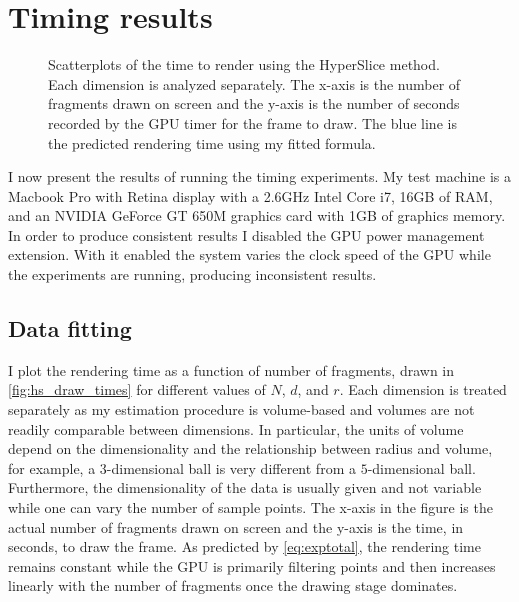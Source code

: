 
\section{Timing results}
\label{sec:timingresults}

\begin{figure}[t]
  \centering
  \resizebox{\linewidth}{!}{%
    {\tiny }}
  \caption[Scatterplots of the time to render using the HyperSlice method.]{%
    Scatterplots of the time to render using the HyperSlice method.
    Each dimension is analyzed separately.  The x-axis is the number of
    fragments drawn on screen and the y-axis is the number of seconds
    recorded by the GPU timer for the frame to draw.
    The blue line is the predicted rendering time using my fitted 
    formula. 
  }
  \label{fig:hs_draw_times}
\end{figure}

I now present the results of running the timing experiments.  My test
machine is a Macbook Pro with Retina display with a 2.6GHz Intel Core i7, 16GB
of RAM, and an NVIDIA GeForce GT 650M graphics card with 1GB of graphics
memory.  In order to produce consistent results I disabled the GPU power
management extension.  With it enabled the system varies the clock speed of
the GPU while the experiments are running, producing inconsistent results.

\subsection{Data fitting}
\label{sec:datafitting}

I plot the rendering time as a function of number of fragments,
drawn in \autoref{fig:hs_draw_times} for different values of $N$, $d$, and $r$. 
Each dimension is treated separately as my estimation procedure is volume-based
and volumes are not readily comparable between dimensions.  
In particular, the units of volume depend on the dimensionality and the 
relationship between radius and volume,
for example, a $3$-dimensional ball is very different from a
$5$-dimensional ball.
Furthermore, the dimensionality of the data is usually given and not 
variable while one can vary the number of sample points.
The x-axis in the figure is
the actual number of fragments drawn on screen and the y-axis is the 
time, in seconds, to draw the frame.  As predicted by \autoref{eq:exptotal},
the rendering time remains constant while the GPU is primarily filtering 
points and then increases linearly with the number of fragments once the 
drawing stage dominates.

